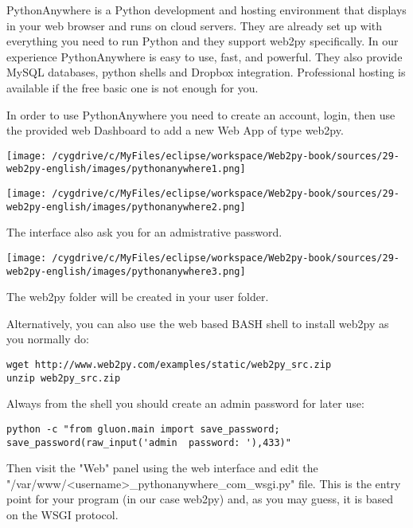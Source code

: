 \documentclass[justified,sixbynine,notoc]{tufte-book}
\begin{document}
\begin{fullwidth}
PythonAnywhere is a Python development and hosting environment that displays in your web browser and runs on cloud servers. They are already set up with everything you need to run Python
and they support web2py specifically. In our experience PythonAnywhere is easy to use, fast, and powerful. They also provide MySQL databases, python shells and Dropbox integration.
Professional hosting is available if the free basic one is not enough for you.

In order to use PythonAnywhere you need to create an account, login, then use the provided web Dashboard to add a new Web App of type web2py.


\goodbreak\begin{center}\texttt{[image: /cygdrive/c/MyFiles/eclipse/workspace/Web2py-book/sources/29-web2py-english/images/pythonanywhere1.png]}\end{center}


\goodbreak\begin{center}\texttt{[image: /cygdrive/c/MyFiles/eclipse/workspace/Web2py-book/sources/29-web2py-english/images/pythonanywhere2.png]}\end{center}


The interface also ask you for an admistrative password.


\goodbreak\begin{center}\texttt{[image: /cygdrive/c/MyFiles/eclipse/workspace/Web2py-book/sources/29-web2py-english/images/pythonanywhere3.png]}\end{center}


The web2py folder will be created in your user folder.

Alternatively, you can also use the web based BASH shell to install web2py as you normally do:

\begin{lstlisting}
wget http://www.web2py.com/examples/static/web2py_src.zip
unzip web2py_src.zip
\end{lstlisting}

Always from the shell you should create an admin password for later use:

\begin{lstlisting}
python -c "from gluon.main import save_password; save_password(raw_input('admin  password: '),433)"
\end{lstlisting}

Then visit the "Web" panel using the web interface and edit the "/var/www/<username>\_pythonanywhere\_com\_wsgi.py" file. This is the entry point for your program (in our case web2py) and, as you may guess, it is based on the WSGI protocol.


\end{fullwidth}
\end{document}
